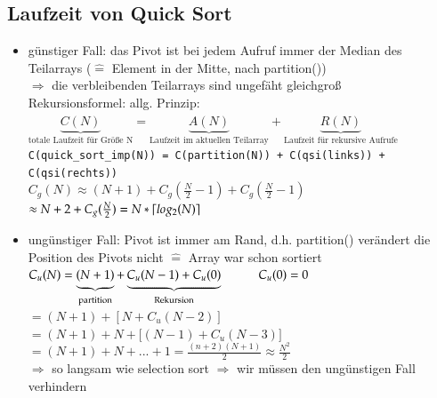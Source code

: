 \documentclass[11pt, fleqn]{scrreprt}
\DeclarePairedDelimiter\ceil{\lceil}{\rceil}
\begin{document}
    \subsection*{Laufzeit von Quick Sort}
    \begin{itemize}
        \item günstiger Fall: das Pivot ist bei jedem Aufruf immer der Median des Teilarrays ($\widehat{=}$ Element in der Mitte, nach partition())\\
        $\Rightarrow$ die verbleibenden Teilarrays sind ungefäht gleichgroß \\

        Rekursionsformel: allg. Prinzip: $\underbrace{C(N)}_{\text{totale Laufzeit für Größe N}} = \underbrace{A(N)}_{\text{Laufzeit im aktuellen Teilarray}} + \underbrace{R(N)}_{\text{Laufzeit für rekursive Aufrufe}}$\\

        \verb|C(quick_sort_imp(N)) = C(partition(N)) + C(qsi(links)) + C(qsi(rechts))| \\

        \vspace*{-5mm}
        $C_g(N) \approx (N+1)+C_g(\frac{N}{2} -1) + C_g(\frac{N}{2} -1)$\\

        \vspace*{-5mm}
        $\approx N + 2+ C_g(\frac{N}{2}) = N*\ceil{log_2(N)}$

        \item ungünstiger Fall: Pivot ist immer am Rand, d.h. partition() verändert die Position des Pivots nicht $\widehat{=}$ Array war schon sortiert \\
        $C_u(N) = \underbrace{(N+1)}_{\text{partition}} + \underbrace{C_u(N - 1) + C_u(0)}_{\text{Rekursion}} \hspace*{1cm} C_u(0)=0$ \\

        \vspace*{-5mm}
        $ = (N+1) + [N + C_u(N-2)]$ \\

        \vspace*{-5mm}
        $= (N+1) + N + \biggl\lbrack(N-1) + C_u(N-3)\biggr\rbrack$ \\

        \vspace*{-5mm}
        $ = (N+1) + N + ... + 1 = \frac{(n+2)(N+1)}{2} \approx \frac{N^2}{2}$ \\
        \vspace*{-2mm}
        $\Rightarrow$ so langsam wie selection sort $\Rightarrow$ wir müssen den ungünstigen Fall verhindern


\end{itemize}
\end{document}
